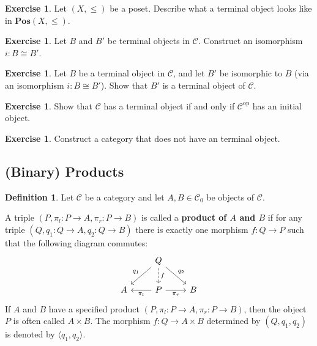 \documentclass[a4paper,10pt]{scrartcl}
\theoremstyle{plain}
\theoremstyle{definition}
\newtheorem{dfn}[thm]{Definition}
\newtheorem{exer}[thm]{Exercise}
\newcommand{\Cat}[1]{\mathcal{#1}}
\newcommand{\CC}{\Cat{C}}
\newcommand{\Catb}[1]{\mathbf{#1}}
\newcommand{\POS}{\Catb{Pos}}
\newcommand{\Ob}[1]{{#1}_0}
\newcommand{\op}[1]{\ensuremath{{#1}^\text{op}}}
\newcommand{\projl}{\ensuremath{\pi_l}}
\newcommand{\projr}{\ensuremath{\pi_r}}
\begin{document}
\begin{exer}
  Let $(X,\leq)$ be a poset. Describe what a terminal object looks like in  $\POS(X,\leq)$.
\end{exer}

\begin{exer}\label{exer:terminal-unique}
  Let $B$ and $B'$ be terminal objects in $\CC$. Construct an isomorphism $i : B \cong B'$.
\end{exer}

\begin{exer}
  Let $B$ be a terminal object in $\CC$, and let $B'$ be isomorphic to $B$ (via an isomorphism $i : B \cong B'$).
  Show that $B'$ is a terminal object of $\CC$.
\end{exer}

\begin{exer}
  Show that $\CC$ has a terminal object if and only if $\op\CC$ has an initial object.
\end{exer}

\begin{exer}
  Construct a category that does not have an terminal object.
\end{exer}

\subsection{(Binary) Products}
\label{sec:products}



\begin{dfn}
  Let $\CC$ be a category and let $A,B \in \Ob\CC$ be objects of $\CC$.

  A triple $(P,\projl : P \to A ,\projr : P \to B)$ is called a \textbf{product of $A$ and $B$} if for any triple $(Q,q_1 : Q \to A, q_2 : Q \to B)$ there is exactly one morphism $f : Q \to P$ such that the following diagram commutes:
  \[
    \begin{tikzcd}
      &
      Q \ar[ld, "q_1"'] \ar[rd, "q_2"] \ar[d, dashed, "f"]
      &
      \\
      A
      &
      P \ar[l, "\projl"] \ar[r, "\projr"']
      &
      B
    \end{tikzcd}
  \]
  If $A$ and $B$ have a specified product $(P,\projl : P \to A ,\projr : P \to B)$, then the object $P$ is often called $A \times B$.
  The morphism $f : Q \to A \times B$ determined by $(Q, q_1, q_2)$ is denoted by $\langle q_1, q_2 \rangle$.
\end{dfn}
\end{document}
